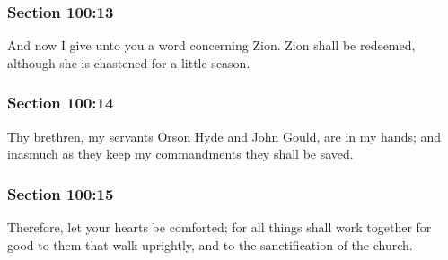 	\subsubsection{Section 100:13} %
		\label{DC100-13}

		And now I give unto you a word concerning Zion.  Zion shall be redeemed, although she is chastened for a little season.


	\subsubsection{Section 100:14} %
		\label{DC100-14}

		Thy brethren, my servants Orson Hyde and John Gould, are in my hands; and inasmuch as they keep my commandments they shall be saved.


	\subsubsection{Section 100:15} %
		\label{DC100-15}

		Therefore, let your hearts be comforted; for all things shall work together for good to them that walk uprightly, and to the sanctification of the church.


